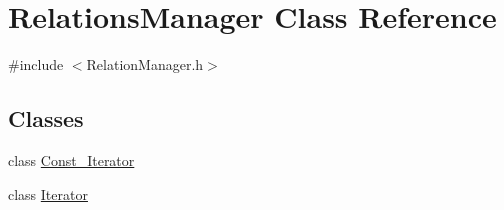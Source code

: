 \hypertarget{classRelationsManager}{}\section{Relations\+Manager Class Reference}
\label{classRelationsManager}


{\ttfamily \#include $<$Relation\+Manager.\+h$>$}

\subsection*{Classes}
\begin{DoxyCompactItemize}
\item 
class \hyperlink{classRelationsManager_1_1Const__Iterator}{Const\+\_\+\+Iterator}
\item 
class \hyperlink{classRelationsManager_1_1Iterator}{Iterator}
\end{DoxyCompactItemize}
